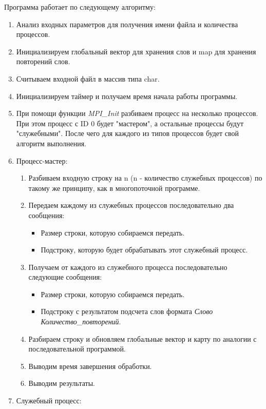 \documentclass[12pt,a4paper]{report}
\begin{document}
					Программа работает по следующему алгоритму:
					\begin{enumerate}
						\item Анализ входных параметров для получения имени файла и количества процессов.
						\item Инициализируем глобальный вектор для хранения слов и map для хранения повторений слов.
						\item Считываем входной файл в массив типа char.
						\item Инициализируем таймер и получаем время начала работы программы.
						\item При помощи функции \textit{MPI\_Init} разбиваем процесс на несколько процессов. При этом процесс с ID 0 будет "мастером", а остальные процессы будут "служебными". После чего для каждого из типов процессов будет свой алгоритм выполнения.
						\item Процесс-мастер:
							\begin{enumerate}
								\item Разбиваем входную строку на n (n - количество служебных процессов) по такому же принципу, как в многопоточной программе.
								\item Передаем каждому из служебных процессов последовательно два сообщения:
									\begin{itemize}
										\item Размер строки, которую собираемся передать.
										\item Подстроку, которую будет обрабатывать этот служебный процесс.
									\end{itemize}
								\item Получаем от каждого из служебного процесса последовательно следующие сообщения:
									\begin{itemize}
										\item Размер строки, которую собираемся передать.
										\item Подстроку с результатом подсчета слов формата \textit{Слово Количество\_повторений}.
									\end{itemize}
								\item Разбираем строку и обновляем глобальные вектор и карту по аналогии с последовательной программой.
								\item Выводим время завершения обработки.
								\item Выводим результаты.
							\end{enumerate}
						\item Служебный процесс:

\end{enumerate}
\end{document}
